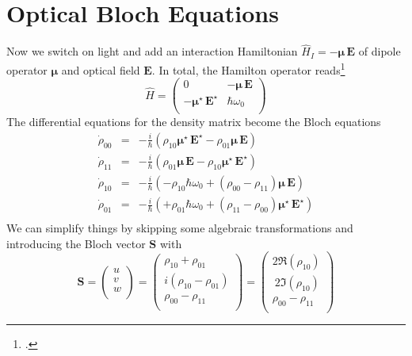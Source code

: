 \section{Optical Bloch Equations}

Now we switch on light and add an interaction Hamiltonian $\hat{H}_I = -\boldsymbol{\mu} \, \boldsymbol{E}$ of dipole operator $\boldsymbol{\mu} $ and optical field   $\boldsymbol{E}$. In total, the Hamilton operator reads\footcite[chap. 3.8]{Rand2016}
\[
 \hat{H } = \begin{pmatrix}
  0 & - {\boldsymbol{\mu}} \, \boldsymbol{E} \\ - {\boldsymbol{\mu}}^\star \, \boldsymbol{E}^\star & \hbar \omega_0 \\
 \end{pmatrix}
\]
The differential equations for the density matrix become the Bloch equations
\begin{eqnarray*}
\dot{\rho}_{00} &=&  - \frac{i}{\hbar} \left( \rho_{10} \boldsymbol{\mu}^\star \, \boldsymbol{E}^\star - \rho_{01} \boldsymbol{\mu} \, \boldsymbol{E} \right) \\
%
\dot{\rho}_{11} &=&  - \frac{i}{\hbar} \left( \rho_{01} \boldsymbol{\mu} \, \boldsymbol{E} - \rho_{10} \boldsymbol{\mu}^\star \, \boldsymbol{E}^\star \right) \\
%
\dot{\rho}_{10} &=& - \frac{i}{\hbar}  \left( - \rho_{10} \hbar \omega_0 + (\rho_{00} - \rho_{11})  \boldsymbol{\mu} \, \boldsymbol{E}\right) \\
%
\dot{\rho}_{01} &=& - \frac{i}{\hbar}  \left( + \rho_{01} \hbar \omega_0 + (\rho_{11} - \rho_{00})  \boldsymbol{\mu}^\star \, \boldsymbol{E}^\star \right) \\
%
\end{eqnarray*}
We can simplify things by skipping some algebraic transformations and introducing the Bloch vector $\boldsymbol{S}$ with
\[
\boldsymbol{S} = 
\begin{pmatrix}
u \\ v \\ w \\
\end{pmatrix}
= 
\begin{pmatrix}
\rho_{10} + \rho_{01} \\ i (\rho_{10} - \rho_{01}) \\ \rho_{00} - \rho_{11} \\
\end{pmatrix}
= 
\begin{pmatrix}
2 \Re (\rho_{10})  \\ \ 2 \Im (\rho_{10}) \\ \rho_{00} - \rho_{11} \\
\end{pmatrix}
\]
